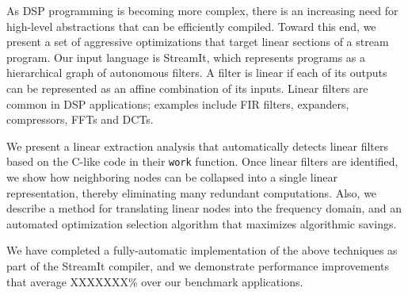 As DSP programming is becoming more complex, there is an increasing
need for high-level abstractions that can be efficiently compiled.
Toward this end, we present a set of aggressive optimizations that
target linear sections of a stream program.  Our input language is
StreamIt, which represents programs as a hierarchical graph of
autonomous filters.  A filter is linear if each of its outputs can be
represented as an affine combination of its inputs.  Linear filters
are common in DSP applications; examples include FIR filters,
expanders, compressors, FFTs and DCTs.

We present a linear extraction analysis that automatically detects
linear filters based on the C-like code in their {\tt work} function.
Once linear filters are identified, we show how neighboring nodes can
be collapsed into a single linear representation, thereby eliminating
many redundant computations.  Also, we describe a method for
translating linear nodes into the frequency domain, and an automated 
optimization selection algorithm that maximizes algorithmic savings.

We have completed a fully-automatic implementation of the above
techniques as part of the StreamIt compiler, and we demonstrate
performance improvements that average XXXXXXX\% over our benchmark
applications.



